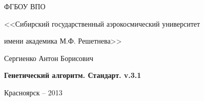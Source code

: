 \thispagestyle{empty}

\begin{center}
ФГБОУ ВПО \par
<<Сибирский государственный аэрокосмический университет \par имени академика М.Ф. Решетнева>>\par 
\par
\end{center}

\vspace{20mm}

\vspace{30mm}
\begin{center}
{\large Сергиенко Антон Борисович}
\end{center}

\vspace{5mm}
\begin{center}
{\bf \large Генетический алгоритм. Стандарт. v.3.1
\par}

\vspace{10mm}

\vspace{10mm}

\end{center}

\vspace{80mm}

\vspace{20mm}
\begin{center}
{Красноярск -- 2013}
\end{center}

\newpage